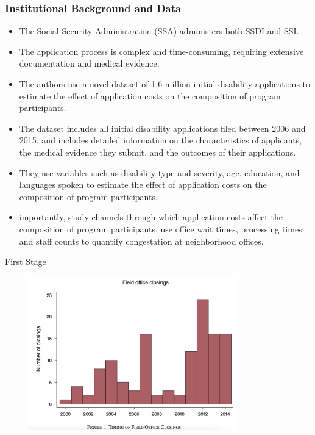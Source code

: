 \documentclass{beamer}
\begin{document}
\begin{frame}[allowframebreaks]
    \frametitle{Institutional Background and Data}
    \begin{itemize}
        \item The Social Security Administration (SSA) administers both SSDI and SSI. 
        \item The application process is complex and time-consuming, requiring extensive documentation and medical evidence.
        \item The authors use a novel dataset of 1.6 million initial disability applications to estimate the effect of application costs on the composition of program participants.
        \item The dataset includes all initial disability applications filed between 2006 and 2015, and includes detailed information on the characteristics of applicants, the medical evidence they submit, and the outcomes of their applications.
        \item They use variables such as disability type and severity, age, education, and languages spoken to estimate the effect of application costs on the composition of program participants.
        \item importantly, study channels through which application costs affect the composition of program participants, use office wait times, processing times and staff counts to quantify congestation at neighborhood offices.
    \end{itemize}
\end{frame}
    
\begin{frame}{First Stage}
    \begin{figure}
        \centering
        \includegraphics[width=0.8\textwidth]{F1.png}
    \end{figure}
\end{frame}
\end{document}
